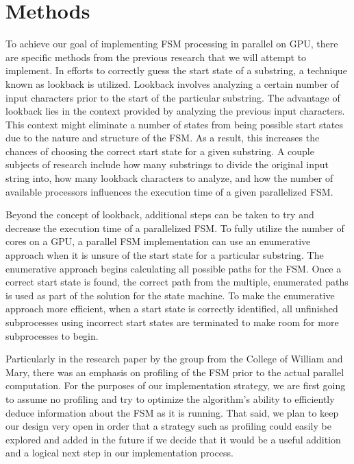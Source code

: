 \documentclass{sigplanconf}
\begin{document}
\section{Methods}

To achieve our goal of implementing FSM processing in parallel on GPU, there are specific methods from the previous research that we will attempt to implement. In efforts to correctly guess the start state of a substring, a technique known as lookback is utilized. Lookback involves analyzing a certain number of input characters prior to the start of the particular substring. The advantage of lookback lies in the context provided by analyzing the previous input characters. This context might eliminate a number of states from being possible start states due to the nature and structure of the FSM. As a result, this increases the chances of choosing the correct start state for a given substring. A couple subjects of research include how many substrings to divide the original input string into, how many lookback characters to analyze, and how the number of available processors influences the execution time of a given parallelized FSM.

Beyond the concept of lookback, additional steps can be taken to try and decrease the execution time of a parallelized FSM. To fully utilize the number of cores on a GPU, a parallel FSM implementation can use an enumerative approach when it is unsure of the start state for a particular substring. The enumerative approach begins calculating all possible paths for the FSM. Once a correct start state is found, the correct path from the multiple, enumerated paths is used as part of the solution for the state machine. To make the enumerative approach more efficient, when a start state is correctly identified, all unfinished subprocesses using incorrect start states are terminated to make room for more subprocesses to begin.

Particularly in the research paper by the group from the College of William and Mary, there was an emphasis on profiling of the FSM prior to the actual parallel computation. For the purposes of our implementation strategy, we are first going to assume no profiling and try to optimize the algorithm's ability to efficiently deduce information about the FSM as it is running. That said, we plan to keep our design very open in order that a strategy such as profiling could easily be explored and added in the future if we decide that it would be a useful addition and a logical next step in our implementation process.
\end{document}
